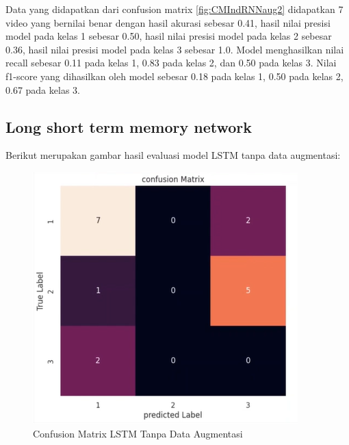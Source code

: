 Data yang didapatkan dari confusion matrix \ref{fig:CMIndRNNaug2} didapatkan 7 video yang bernilai benar
dengan hasil akurasi sebesar 0.41, hasil nilai presisi model pada kelas 1 sebesar 0.50, hasil nilai
presisi model pada kelas 2 sebesar 0.36, hasil nilai presisi model pada kelas 3 sebesar 1.0. Model menghasilkan
nilai recall sebesar 0.11 pada kelas 1, 0.83 pada kelas 2, dan 0.50 pada kelas 3. Nilai f1-score yang dihasilkan
oleh model sebesar 0.18 pada kelas 1, 0.50 pada kelas 2, 0.67 pada kelas 3.

\subsection{Long short term memory network}

Berikut merupakan gambar hasil evaluasi model LSTM tanpa data augmentasi:
\newpage
\begin{figure} [ht] \centering
  \includegraphics[scale=1.3]{gambar/CMLSTMnoAug2.png}
  \caption{Confusion Matrix LSTM Tanpa Data Augmentasi}
  \label{fig:CMLSTMnoaug2}
\end{figure}

